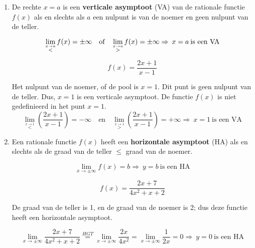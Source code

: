 \begin{enumerate}
\item De rechte $x=a$ is een \textbf{verticale asymptoot} (VA) van de
rationale functie $f(x)$ als en slechts als $a$ een nulpunt is van
de noemer en geen nulpunt van de teller.

\begin{equation*}
\lim_{\overset{x\rightarrow a}{<}}f(x)=\pm\infty\quad\textrm{of}\quad \lim_{\overset{x\rightarrow a}{>}}f(x)=\pm\infty \\
		\Rightarrow\:x=a\:\textrm{is een VA}
\end{equation*}

\begin{voorbeeld}
\begin{equation*}
f(x)=\frac{2x+1}{x-1}
\end{equation*}

Het nulpunt van de noemer, of de pool is $x=1$. Dit punt is geen
nulpunt van de teller. Dus, $x=1$ is een verticale asymptoot. De
functie $f(x)$ is niet gedefinieerd in het punt $x=1$.
\begin{equation*}
\lim_{\overset{x\rightarrow1}{<}}\left(\frac{2x+1}{x-1}\right)=-\infty\quad\textrm{en}\quad \lim_{\overset{x\rightarrow1}{>}}\left(\frac{2x+1}{x-1}\right)=+\infty
\Rightarrow\:x=1\:\textrm{is een VA}
\end{equation*}

\end{voorbeeld}

\item Een rationale functie $f(x)$ heeft een \textbf{horizontale asymptoot}
(HA) als en slechts als de graad van de teller \ensuremath{\le} graad
van de noemer.

\begin{equation*}
\lim_{x\to\pm\infty}f(x)=b
\Rightarrow\:y=b\:\textrm{is een HA}
\end{equation*}

\begin{voorbeeld}
\begin{equation*}
f(x)=\frac{2x+7}{4x^{2}+x+2}
\end{equation*}

De graad van de teller is 1, en de graad van de noemer is 2; dus deze
functie heeft een horizontale asymptoot.

\begin{equation*}
\lim_{x\to\pm\infty}\frac{2x+7}{4x^{2}+x+2}\overset{HGT}{=} \lim_{x\to\pm\infty}\frac{2x}{4x^{2}}=\lim_{x\to\pm\infty}\frac{1}{2x}=0
\displaystyle \Rightarrow\:y=0\:\textrm{is een HA}
\end{equation*}


\end{voorbeeld}
\end{enumerate}
